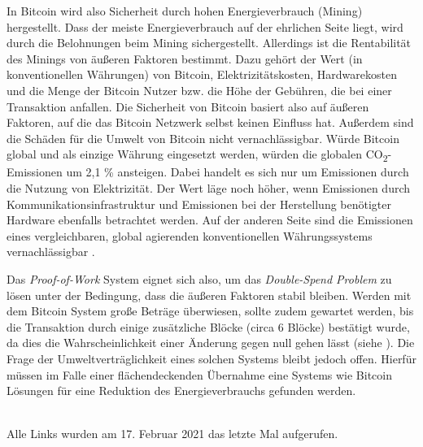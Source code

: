 \documentclass[ngerman,runningheads,a4paper]{llncs}[2018/03/10]
\begin{document}
In Bitcoin wird also Sicherheit durch hohen Energieverbrauch (Mining) hergestellt. Dass der meiste Energieverbrauch auf der ehrlichen Seite liegt, wird durch die Belohnungen beim Mining sichergestellt. Allerdings ist die Rentabilität des Minings von äußeren Faktoren bestimmt. Dazu gehört der Wert (in konventionellen Währungen) von Bitcoin, Elektrizitätskosten, Hardwarekosten und die Menge der Bitcoin Nutzer bzw. die Höhe der Gebühren, die bei einer Transaktion anfallen. Die Sicherheit von Bitcoin basiert also auf äußeren Faktoren, auf die das Bitcoin Netzwerk selbst keinen Einfluss hat. Außerdem sind die Schäden für die Umwelt von Bitcoin nicht vernachlässigbar. Würde Bitcoin global und als einzige Währung eingesetzt werden, würden die globalen CO\textsubscript{2}-Emissionen um 2,1 \% ansteigen. Dabei handelt es sich nur um Emissionen durch die Nutzung von Elektrizität. Der Wert läge noch höher, wenn Emissionen durch Kommunikationsinfrastruktur und Emissionen bei der Herstellung benötigter Hardware ebenfalls betrachtet werden. Auf der anderen Seite sind die Emissionen eines vergleichbaren, global agierenden konventionellen Währungssystems vernachlässigbar \citep{Becker2013}. 

Das \textit{Proof-of-Work} System eignet sich also, um das \textit{Double-Spend Problem} zu lösen unter der Bedingung, dass die äußeren Faktoren stabil bleiben. Werden mit dem Bitcoin System große Beträge überwiesen, sollte zudem gewartet werden, bis die Transaktion durch einige zusätzliche Blöcke (circa 6 Blöcke) bestätigt wurde, da dies die Wahrscheinlichkeit einer Änderung gegen null gehen lässt (siehe ). Die Frage der Umweltverträglichkeit eines solchen Systems bleibt jedoch offen. Hierfür müssen im Falle einer flächendeckenden Übernahme eine Systems wie Bitcoin Lösungen für eine Reduktion des Energieverbrauchs gefunden werden. 

\renewcommand{\bibsection}{\section*{Referenzen}} %

\begingroup
  \ifluatex
  \else
  \fi
  \small %
  
\endgroup

\ \\
%
Alle Links wurden am 17. Februar 2021 das letzte Mal aufgerufen.
\end{document}
